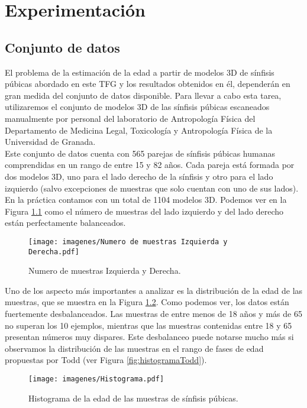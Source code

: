 \chapter{Experimentación}\label{chap:experimentos}

\section{Conjunto de datos}
\label{sec:conjuntodedatosintro}
El problema de la estimación de la edad a partir de modelos 3D de sínfisis púbicas abordado en este TFG y los resultados obtenidos en él, dependerán en gran medida del conjunto de datos disponible. Para llevar a cabo esta tarea, utilizaremos el conjunto de modelos 3D de las sínfisis púbicas escaneados manualmente por personal del laboratorio de Antropología Física del Departamento de Medicina Legal, Toxicología y Antropología Física de la Universidad de Granada.\\

Este conjunto de datos cuenta con 565 parejas de sínfisis púbicas humanas comprendidas en un rango de entre 15 y 82 años. Cada pareja está formada por dos modelos 3D, uno para el lado derecho de la sínfisis y otro para el lado izquierdo (salvo excepciones de muestras que solo cuentan con uno de sus lados). En la práctica contamos con un total de 1104 modelos 3D. Podemos ver en la Figura \ref{fig:izqdch} como el número de muestras del lado izquierdo y del lado derecho están perfectamente balanceados.

\begin{figure}[ht]
    \centering
    \texttt{[image: imagenes/Numero de muestras Izquierda y Derecha.pdf]}
    \caption{Numero de muestras Izquierda y Derecha.}
    \label{fig:izqdch}
\end{figure}

\newpage

Uno de los aspecto más importantes a analizar es la distribución de la edad de las muestras, que se muestra en la Figura \ref{fig:histograma}. Como podemos ver, los datos están fuertemente desbalanceados. Las muestras de entre menos de 18 años y más de 65 no superan los 10 ejemplos, mientras que las muestras contenidas entre 18 y 65 presentan números muy dispares. Este desbalanceo puede notarse mucho más si observamos la distribución de las muestras en el rango de fases de edad propuestas por Todd (ver Figura \ref{fig:histogramaTodd}).

\begin{figure}[ht]
    \centering
    \texttt{[image: imagenes/Histograma.pdf]}
    \caption{Histograma de la edad de las muestras de sínfisis púbicas.}
    \label{fig:histograma}
\end{figure}

